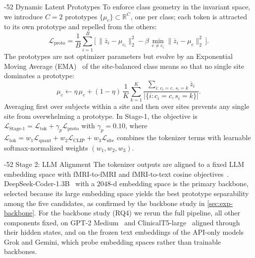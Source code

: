 \documentclass[runningheads]{llncs}
\makeatletter
\renewcommand\subsection{\@startsection{subsection}{2}{\z@}%
  {-5\p@ \@plus -1\p@ \@minus -1\p@}{2\p@ \@plus 1\p@ \@minus 1\p@}%
  {\normalfont\normalsize\bfseries\boldmath}}
\newcommand{\Lquant}{\mathcal{L}_{\mathrm{quant}}}
\newcommand{\Lclip}{\mathcal{L}_{\mathrm{CLIP}}}
\newcommand{\Lgrl}{\mathcal{L}_{\mathrm{site}}}
\newcommand{\Lproto}{\mathcal{L}_{\mathrm{proto}}}
\newcommand{\Ltok}{\mathcal{L}_{\mathrm{tok}}}
\makeatother
\begin{document}
\subsection{Dynamic Latent Prototypes}
\label{sec:method-proto}
To enforce class geometry in the invariant space, we introduce $C=2$ prototypes $\{\mu_c\}\subset\mathbb{R}^{C}$, 
one per class; each token is attracted to its own prototype and repelled from the others:
\begin{equation}
\Lproto = \frac{1}{B}\sum_{i=1}^{B}
\Big[\,\lVert \bar z_i-\mu_{c_i}\rVert_2^2
-\beta\,\textstyle\min_{c\neq c_i}\lVert \bar z_i-\mu_{c}\rVert_2^2\,\Big].
\label{eq:proto}
\end{equation}
The prototypes are not optimizer parameters but evolve by an Exponential Moving Average (EMA)~\cite{vandenoord2017vqvae} of the site-balanced class means so that no single site dominates a prototype:
\begin{equation}
\mu_c \leftarrow \eta\,\mu_c + (1-\eta)\,
\frac{1}{K}\sum_{k=1}^{K}
\frac{\sum_{i:\,c_i=c,\,s_i=k}\bar z_i}{\lvert\{i:c_i=c,s_i=k\}\rvert}.
\label{eq:ema}
\end{equation}
Averaging first over subjects within a site and then over sites prevents any single site from overwhelming a prototype. In Stage-1, the objective is $\mathcal{L}_{\mathrm{Stage\text{-}1}}=
\Ltok+\gamma_p\Lproto$ with $\gamma_p{=}0.10$, where $\Ltok=w_1\Lquant+w_2\Lclip+w_3\Lgrl$ combines the tokenizer terms with learnable softmax-normalized weights $(w_1,w_2,w_3)$.

\subsection{Stage 2: LLM Alignment}
\label{sec:method-stage2}
The tokenizer outputs are aligned to a fixed LLM embedding space with 
fMRI-to-fMRI and fMRI-to-text cosine objectives~\cite{radford2021clip}. 
DeepSeek-Coder-1.3B~\cite{deepseek2024} with a $2048$-d embedding space is the 
primary backbone, selected because its large embedding space yields the best 
prototype separability among the five candidates, as confirmed by the backbone 
study in \cref{sec:exp-backbone}. For the backbone study (RQ4) we rerun 
the full pipeline, all other components fixed, on GPT-2 Medium~\cite{radford2019gpt2} 
and ClinicalT5-large~\cite{raffel2020t5} aligned through their hidden states, and 
on the frozen text embeddings of the API-only models Grok and Gemini, which 
probe embedding spaces rather than trainable backbones.
\end{document}
